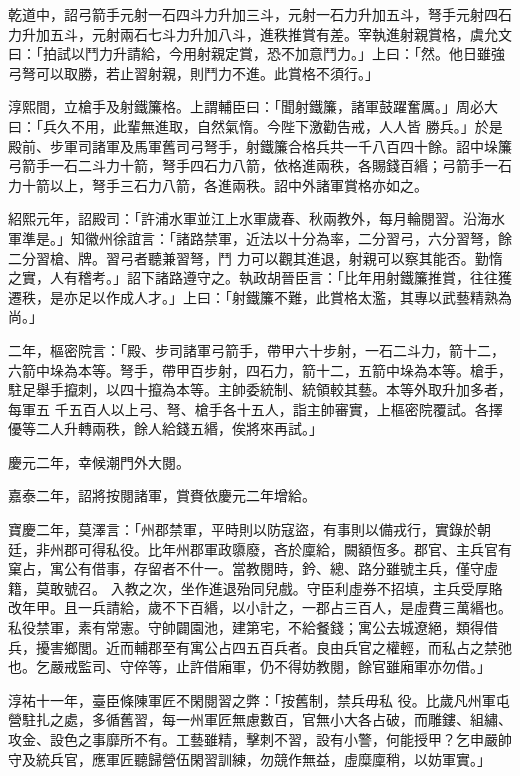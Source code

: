 \begin{pinyinscope}
 乾道中，詔弓箭手元射一石四斗力升加三斗，元射一石力升加五斗，弩手元射四石力升加五斗，元射兩石七斗力升加八斗，進秩推賞有差。宰執進射親賞格，虞允文曰：「拍試以鬥力升請給，今用射親定賞，恐不加意鬥力。」上曰：「然。他日雖強弓弩可以取勝，若止習射親，則鬥力不進。此賞格不須行。」



 淳熙間，立槍手及射鐵簾格。上謂輔臣曰：「聞射鐵簾，諸軍鼓躍奮厲。」周必大曰：「兵久不用，此輩無進取，自然氣惰。今陛下激勸告戒，人人皆
 勝兵。」於是殿前、步軍司諸軍及馬軍舊司弓弩手，射鐵簾合格兵共一千八百四十餘。詔中垛簾弓箭手一石二斗力十箭，弩手四石力八箭，依格進兩秩，各賜錢百緡；弓箭手一石力十箭以上，弩手三石力八箭，各進兩秩。詔中外諸軍賞格亦如之。



 紹熙元年，詔殿司：「許浦水軍並江上水軍歲春、秋兩教外，每月輪閱習。沿海水軍準是。」知徽州徐誼言：「諸路禁軍，近法以十分為率，二分習弓，六分習弩，餘二分習槍、牌。習弓者聽兼習弩，鬥
 力可以觀其進退，射親可以察其能否。勤惰之實，人有稽考。」詔下諸路遵守之。執政胡晉臣言：「比年用射鐵簾推賞，往往獲遷秩，是亦足以作成人才。」上曰：「射鐵簾不難，此賞格太濫，其專以武藝精熟為尚。」



 二年，樞密院言：「殿、步司諸軍弓箭手，帶甲六十步射，一石二斗力，箭十二，六箭中垛為本等。弩手，帶甲百步射，四石力，箭十二，五箭中垛為本等。槍手，駐足舉手攛刺，以四十攛為本等。主帥委統制、統領較其藝。本等外取升加多者，每軍五
 千五百人以上弓、弩、槍手各十五人，詣主帥審實，上樞密院覆試。各擇優等二人升轉兩秩，餘人給錢五緡，俟將來再試。」



 慶元二年，幸候潮門外大閱。



 嘉泰二年，詔將按閱諸軍，賞賚依慶元二年增給。



 寶慶二年，莫澤言：「州郡禁軍，平時則以防寇盜，有事則以備戎行，實錄於朝廷，非州郡可得私役。比年州郡軍政隳廢，吝於廩給，闕額恆多。郡官、主兵官有窠占，寓公有借事，存留者不什一。當教閱時，鈐、總、路分雖號主兵，僅守虛籍，莫敢號召。
 入教之次，坐作進退殆同兒戲。守臣利虛券不招填，主兵受厚賂改年甲。且一兵請給，歲不下百緡，以小計之，一郡占三百人，是虛費三萬緡也。私役禁軍，素有常憲。守帥闢園池，建第宅，不給餐錢；寓公去城遼絕，類得借兵，擾害鄉閭。近而輔郡至有寓公占四五百兵者。良由兵官之權輕，而私占之禁弛也。乞嚴戒監司、守倅等，止許借廂軍，仍不得妨教閱，餘官雖廂軍亦勿借。」



 淳祐十一年，臺臣條陳軍匠不閑閱習之弊：「按舊制，禁兵毋私
 役。比歲凡州軍屯營駐扎之處，多循舊習，每一州軍匠無慮數百，官無小大各占破，而雕鏤、組繡、攻金、設色之事靡所不有。工藝雖精，擊刺不習，設有小警，何能授甲？乞申嚴帥守及統兵官，應軍匠聽歸營伍閑習訓練，勿競作無益，虛糜廩稍，以妨軍實。」




\end{pinyinscope}
